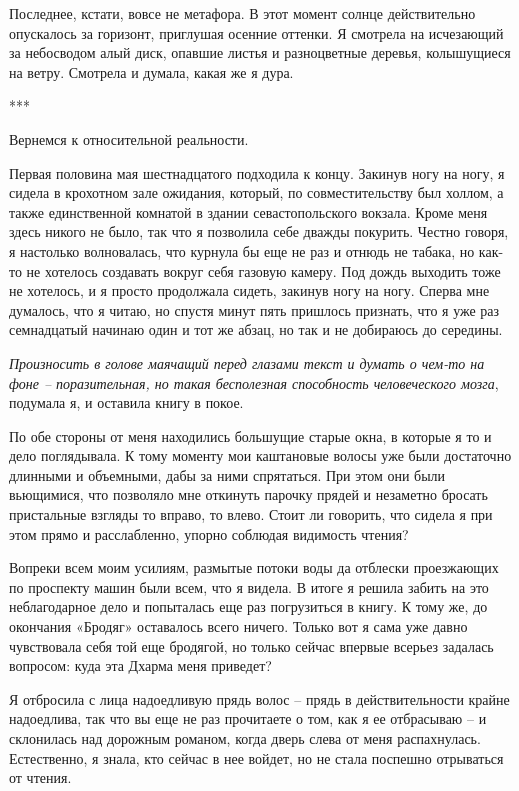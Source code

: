 \documentclass[
]{book}
\begin{document}
Последнее, кстати, вовсе не метафора. В этот момент солнце действительно опускалось за горизонт, приглушая осенние оттенки. Я смотрела на исчезающий за небосводом алый диск, опавшие листья и разноцветные деревья, колышущиеся на ветру. Смотрела и думала, какая же я дура.

***

Вернемся к относительной реальности.

Первая половина мая шестнадцатого подходила к концу. Закинув ногу на ногу, я сидела в крохотном зале ожидания, который, по совместительству был холлом, а также единственной комнатой в здании севастопольского вокзала. Кроме меня здесь никого не было, так что я позволила себе дважды покурить. Честно говоря, я настолько волновалась, что курнула бы еще не раз и отнюдь не табака, но как-то не хотелось создавать вокруг себя газовую камеру. Под дождь выходить тоже не хотелось, и я просто продолжала сидеть, закинув ногу на ногу. Сперва мне думалось, что я читаю, но спустя минут пять пришлось признать, что я уже раз семнадцатый начинаю один и тот же абзац, но так и не добираюсь до середины.

\emph{Произносить в голове маячащий перед глазами текст и думать о чем-то на фоне -- поразительная, но такая бесполезная способность человеческого мозга}, подумала я, и оставила книгу в покое.

По обе стороны от меня находились большущие старые окна, в которые я то и дело поглядывала. К тому моменту мои каштановые волосы уже были достаточно длинными и объемными, дабы за ними спрятаться. При этом они были вьющимися, что позволяло мне откинуть парочку прядей и незаметно бросать пристальные взгляды то вправо, то влево. Стоит ли говорить, что сидела я при этом прямо и расслабленно, упорно соблюдая видимость чтения?

Вопреки всем моим усилиям, размытые потоки воды да отблески проезжающих по проспекту машин были всем, что я видела. В итоге я решила забить на это неблагодарное дело и попыталась еще раз погрузиться в книгу. К тому же, до окончания «Бродяг» оставалось всего ничего. Только вот я сама уже давно чувствовала себя той еще бродягой, но только сейчас впервые всерьез задалась вопросом: куда эта Дхарма меня приведет?

Я отбросила с лица надоедливую прядь волос -- прядь в действительности крайне надоедлива, так что вы еще не раз прочитаете о том, как я ее отбрасываю -- и склонилась над дорожным романом, когда дверь слева от меня распахнулась. Естественно, я знала, кто сейчас в нее войдет, но не стала поспешно отрываться от чтения.
\end{document}
